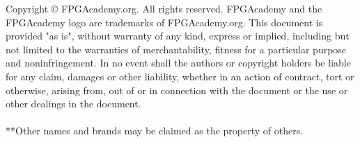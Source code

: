 
\clearpage
\vspace{1in}

\noindent

Copyright {\copyright} FPGAcademy.org. All rights reserved. FPGAcademy and the 
FPGAcademy logo are trademarks of FPGAcademy.org.  This document is provided 
"as is", without warranty of any kind, express or implied, including but not 
limited to the warranties of merchantability, fitness for a particular purpose 
and noninfringement. In no event shall the authors or copyright holders be 
liable for any claim, damages or other liability, whether in an action of 
contract, tort or otherwise, arising from, out of or in connection with the 
document or the use or other dealings in the document.
~\\
~\\
**Other names and brands may be claimed as the property of others.

